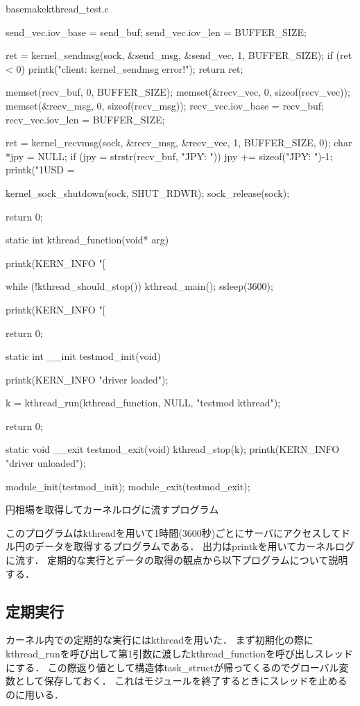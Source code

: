 \begin{longlisting}
\begin{myminted}{basemake}{kthread\_test.c}
{    send_vec.iov_base = send_buf;
    send_vec.iov_len = BUFFER_SIZE;

    ret = kernel_sendmsg(sock, &send_msg, &send_vec, 1, BUFFER_SIZE);
    if (ret < 0) {
        printk("client: kernel_sendmsg error!\n");
        return ret;
    }

    memset(recv_buf, 0, BUFFER_SIZE);
    memset(&recv_vec, 0, sizeof(recv_vec));
    memset(&recv_msg, 0, sizeof(recv_msg));
    recv_vec.iov_base = recv_buf;
    recv_vec.iov_len = BUFFER_SIZE;

    ret = kernel_recvmsg(sock, &recv_msg, &recv_vec, 1, BUFFER_SIZE, 0);
    char *jpy = NULL;
    if (jpy = strstr(recv_buf, "\"JPY\": ")) {
        jpy += sizeof("\"JPY\": ")-1;
    }
    printk("1USD = %

    kernel_sock_shutdown(sock, SHUT_RDWR);
    sock_release(sock);

    return 0;
}

static int kthread_function(void* arg) {
    printk(KERN_INFO "[%

    while (!kthread_should_stop()) {
        kthread_main();
        ssleep(3600);
    }

    printk(KERN_INFO "[%

    return 0;
}

static int __init testmod_init(void) {
    printk(KERN_INFO "driver loaded\n");

    k = kthread_run(kthread_function, NULL, "testmod kthread");

    return 0;
}

static void __exit testmod_exit(void) {
    kthread_stop(k);
    printk(KERN_INFO "driver unloaded\n");
}

module_init(testmod_init);
module_exit(testmod_exit);
\end{myminted}
\caption{円相場を取得してカーネルログに流すプログラム}
\label{lst:rate}
\end{longlisting}

このプログラムはkthreadを用いて1時間(3600秒)ごとにサーバにアクセスしてドル円のデータを取得するプログラムである．
出力はprintkを用いてカーネルログに流す．
定期的な実行とデータの取得の観点から以下プログラムについて説明する．

\subsection{定期実行}
カーネル内での定期的な実行にはkthreadを用いた．
まず初期化の際にkthread\_runを呼び出して第1引数に渡したkthread\_functionを呼び出しスレッドにする．
この際返り値として構造体task\_structが帰ってくるのでグローバル変数として保存しておく．
これはモジュールを終了するときにスレッドを止めるのに用いる．

